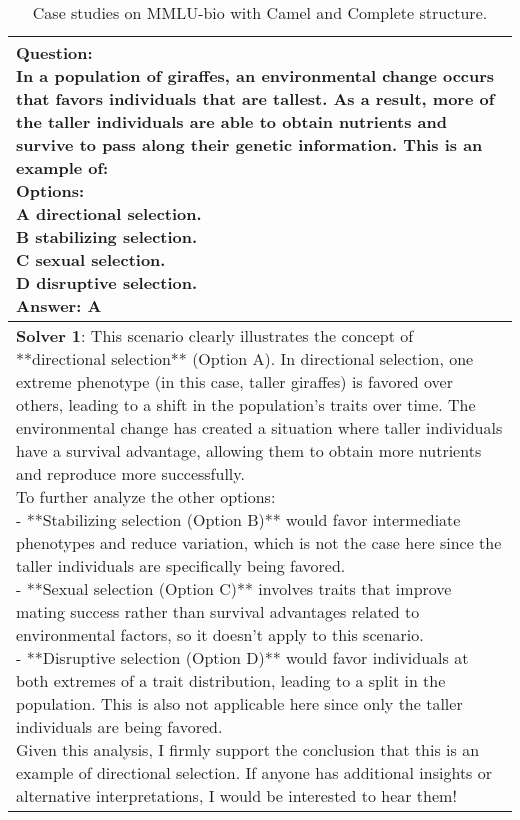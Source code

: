\begin{table*}[]
    \centering
    \caption{Case studies on MMLU-bio with Camel and Complete structure.}
    \vspace{-10pt}
    \label{app:case 1}
    \begin{supertabular}{l}
    \midrule 
    \parbox{16cm}{\small{\textbf{Question}:} \\
    \small{In a population of giraffes, an environmental change occurs that favors individuals that are tallest. As a result, more of the taller individuals are able to obtain nutrients and survive to pass along their genetic information. This is an example of:}\\
    \small{\textbf{Options}:}\\
     \small{A directional selection.}\\
     \small{B stabilizing selection.}\\
     \small{C sexual selection.}\\
     \small{D disruptive selection.}\\
     \small{\textbf{Answer}: A}}\\
    \midrule
    \parbox{16cm}{\small{\textbf{Solver 1}: This scenario clearly illustrates the concept of **directional selection** (Option A). In directional selection, one extreme phenotype (in this case, taller giraffes) is favored over others, leading to a shift in the population's traits over time. The environmental change has created a situation where taller individuals have a survival advantage, allowing them to obtain more nutrients and reproduce more successfully.\\ To further analyze the other options:\\ - **Stabilizing selection (Option B)** would favor intermediate phenotypes and reduce variation, which is not the case here since the taller individuals are specifically being favored.\\ - **Sexual selection (Option C)** involves traits that improve mating success rather than survival advantages related to environmental factors, so it doesn't apply to this scenario.\\- **Disruptive selection (Option D)** would favor individuals at both extremes of a trait distribution, leading to a split in the population. This is also not applicable here since only the taller individuals are being favored.\\ Given this analysis, I firmly support the conclusion that this is an example of directional selection. If anyone has additional insights or alternative interpretations, I would be interested to hear them!\\
}}
\end{supertabular}
\end{table*}

